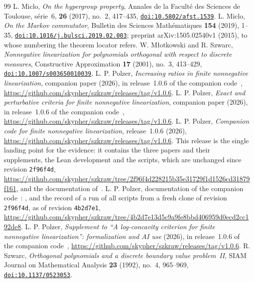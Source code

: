 \begin{thebibliography}{99}
 L. Miclo, \emph{On the hypergroup property}, Annales de la Facult\'e des Sciences de Toulouse, s\'erie~6, \textbf{26} (2017), no.~2, 417--435, \href{https://doi.org/10.5802/afst.1539}{\nolinkurl{doi:10.5802/afst.1539}}.
 L. Miclo, \emph{On the Markov commutator}, Bulletin des Sciences Math\'ematiques \textbf{154} (2019), 1--35, \href{https://doi.org/10.1016/j.bulsci.2019.02.003}{\nolinkurl{doi:10.1016/j.bulsci.2019.02.003}}; preprint arXiv:1505.02540v1 (2015), to whose numbering the theorem locator refers.
 W. M{\l}otkowski and R. Szwarc, \emph{Nonnegative linearization for polynomials orthogonal with respect to discrete measures}, Constructive Approximation \textbf{17} (2001), no.~3, 413--429, \href{https://doi.org/10.1007/s003650010039}{\nolinkurl{doi:10.1007/s003650010039}}.
 L. P. Polzer, \emph{Increasing ratios in finite nonnegative linearization}, companion paper (2026), in release~1.0.6 of the companion code~\cite{code}, \url{https://github.com/skypher/szkraw/releases/tag/v1.0.6}.
 L. P. Polzer, \emph{Exact and perturbative criteria for finite nonnegative linearization}, companion paper (2026), in release~1.0.6 of the companion code~\cite{code}, \url{https://github.com/skypher/szkraw/releases/tag/v1.0.6}.
 L. P. Polzer, \emph{Companion code for finite nonnegative linearization}, release~1.0.6 (2026), \url{https://github.com/skypher/szkraw/releases/tag/v1.0.6}. This release is the single landing point for the evidence: it contains the three papers and their supplements, the Lean development and the scripts, which are unchanged since revision \texttt{2f96f4d}, \url{https://github.com/skypher/szkraw/tree/2f96f4d228215b35e31729f1d1526cd31879f161}, and the documentation of~\cite{docs}.
 L. P. Polzer, documentation of the companion code~\cite{code}: ,  and the record  of a run of all scripts from a fresh clone of revision \texttt{2f96f4d}, as of revision \texttt{4b2d7e1}, \url{https://github.com/skypher/szkraw/tree/4b2d7e13d5c9a9fe8bbd406959d0ecd2cc192de8}.
 L. P. Polzer, \emph{Supplement to ``A log-concavity criterion for finite nonnegative linearization'': formalization and AI use} (2026), in release~1.0.6 of the companion code~\cite{code}, \url{https://github.com/skypher/szkraw/releases/tag/v1.0.6}.
 R. Szwarc, \emph{Orthogonal polynomials and a discrete boundary value problem~II}, SIAM Journal on Mathematical Analysis \textbf{23} (1992), no.~4, 965--969, \href{https://doi.org/10.1137/0523053}{\nolinkurl{doi:10.1137/0523053}}.

\end{thebibliography}
